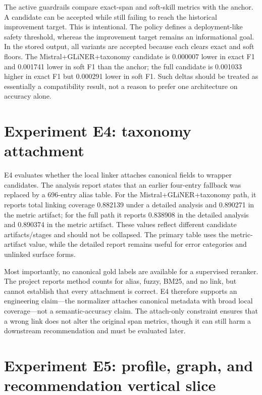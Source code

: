The active guardrails compare exact-span and soft-skill metrics with the anchor. A candidate can be accepted while still failing to reach the historical improvement target. This is intentional. The policy defines a deployment-like safety threshold, whereas the improvement target remains an informational goal. In the stored output, all variants are accepted because each clears exact and soft floors. The Mistral+GLiNER+taxonomy candidate is 0.000007 lower in exact F1 and 0.001741 lower in soft F1 than the anchor; the full candidate is 0.001033 higher in exact F1 but 0.000291 lower in soft F1. Such deltas should be treated as essentially a compatibility result, not a reason to prefer one architecture on accuracy alone.



\section{Experiment E4: taxonomy attachment}

E4 evaluates whether the local linker attaches canonical fields to wrapper candidates. The analysis report states that an earlier four-entry fallback was replaced by a 696-entry alias table. For the Mistral+GLiNER+taxonomy path, it reports total linking coverage 0.882139 under a detailed analysis and 0.890271 in the metric artifact; for the full path it reports 0.838908 in the detailed analysis and 0.890374 in the metric artifact. These values reflect different candidate artifacts/stages and should not be collapsed. The primary table uses the metric-artifact value, while the detailed report remains useful for error categories and unlinked surface forms.

Most importantly, no canonical gold labels are available for a supervised reranker. The project reports method counts for alias, fuzzy, BM25, and no link, but cannot establish that every attachment is correct. E4 therefore supports an engineering claim---the normalizer attaches canonical metadata with broad local coverage---not a semantic-accuracy claim. The attach-only constraint ensures that a wrong link does not alter the original span metrics, though it can still harm a downstream recommendation and must be evaluated later.

\section{Experiment E5: profile, graph, and recommendation vertical slice}

